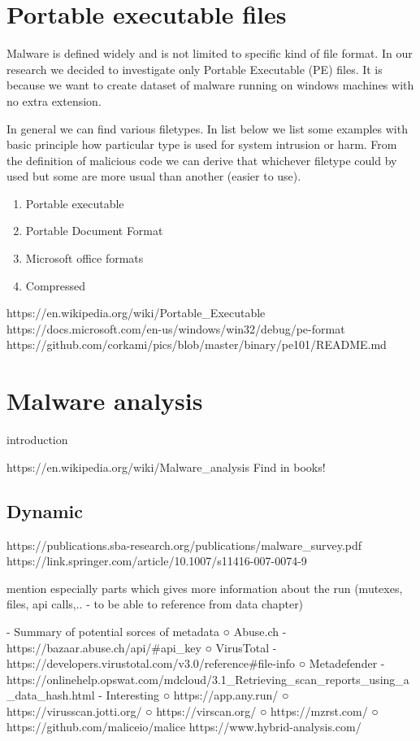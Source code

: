 \section{Portable executable files}
Malware is defined widely and is not limited to specific kind of file format. In our research we decided to investigate only Portable Executable (PE) files. It is because we want to create dataset of malware running on windows machines with no extra extension. 

In general we can find various filetypes. In list below we list some examples with basic principle how particular type is used for system intrusion or harm. From the definition of malicious code we can derive that whichever filetype could by used but some are more usual than another (easier to use).
\begin{enumerate}
  \item Portable executable
  \item Portable Document Format
  \item Microsoft office formats
  \item Compressed
\end{enumerate}

https://en.wikipedia.org/wiki/Portable_Executable
https://docs.microsoft.com/en-us/windows/win32/debug/pe-format
https://github.com/corkami/pics/blob/master/binary/pe101/README.md

\section{Malware analysis}
introduction

https://en.wikipedia.org/wiki/Malware_analysis
Find in books!

\subsection{Dynamic}
https://publications.sba-research.org/publications/malware_survey.pdf
https://link.springer.com/article/10.1007/s11416-007-0074-9

mention especially parts which gives more information about the run (mutexes, files, api calls,.. - to be able to reference from data chapter)

- Summary of potential sorces of metadata
○ Abuse.ch - https://bazaar.abuse.ch/api/#api_key
○ VirusTotal - https://developers.virustotal.com/v3.0/reference#file-info
○ Metadefender - https://onlinehelp.opswat.com/mdcloud/3.1_Retrieving_scan_reports_using_a_data_hash.html
- Interesting
○ https://app.any.run/
○ https://virusscan.jotti.org/
○ https://virscan.org/
○ https://mzrst.com/
○ https://github.com/maliceio/malice
https://www.hybrid-analysis.com/

